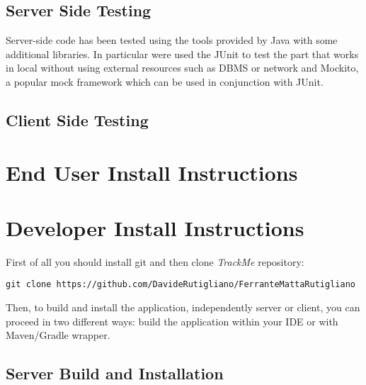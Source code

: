 \documentclass[a4paper]{article}
\begin{document}
\subsection{Server Side Testing}
Server-side code has been tested using the tools provided by Java with some additional libraries. In particular were used the JUnit to test the part that works in local without using external resources such as DBMS or network and Mockito, a popular mock framework which can be used in conjunction with JUnit.

\subsection{Client Side Testing}
\newpage
\section{End User Install Instructions}

\newpage
\section{Developer Install Instructions}
First of all you should install git and then clone \textit{TrackMe} repository:
\begin{lstlisting}
git clone https://github.com/DavideRutigliano/FerranteMattaRutigliano
\end{lstlisting}

Then, to build and install the application, independently server or client, you can proceed in two different ways: build the application within your IDE or with Maven/Gradle wrapper.
\subsection{Server Build and Installation}
\end{document}
